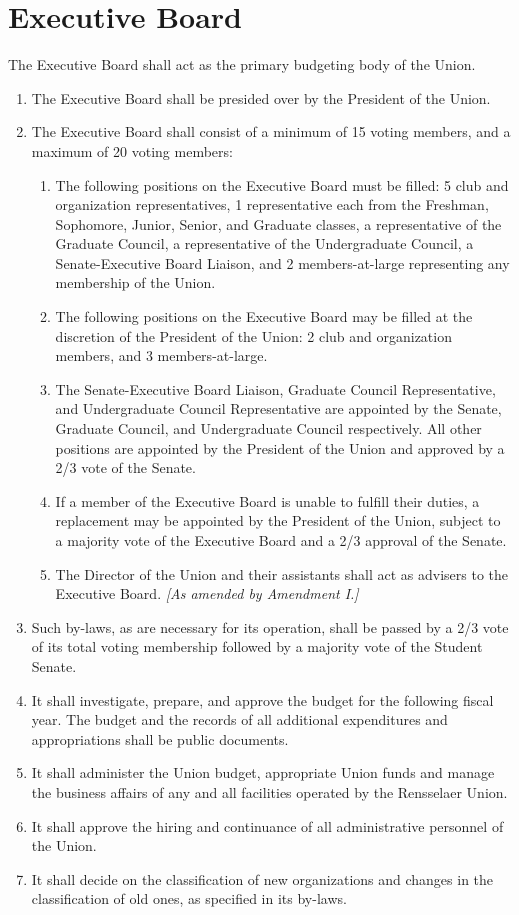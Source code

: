 \documentclass{uniondoc}
\begin{document}
\section{Executive Board}

The Executive Board shall act as the primary budgeting body of the Union.

\begin{enumerate}
\item The Executive Board shall be presided over by the President of the Union.
\item The Executive Board shall consist of a minimum of 15 voting members, and a maximum of 20 voting members:
  \begin{enumerate}
  \item The following positions on the Executive Board must be filled: 5 club and organization representatives, 1 representative each from the Freshman, Sophomore, Junior, Senior, and Graduate classes, a representative of the Graduate Council, a representative of the Undergraduate Council, a Senate-Executive Board Liaison, and 2 members-at-large representing any membership of the Union.
  \item The following positions on the Executive Board may be filled at the discretion of the President of the Union: 2 club and organization members, and 3 members-at-large.
  \item The Senate-Executive Board Liaison, Graduate Council Representative, and Undergraduate Council Representative are appointed by the Senate, Graduate Council, and Undergraduate Council respectively. All other positions are appointed by the President of the Union and approved by a 2/3 vote of the Senate.
  \item If a member of the Executive Board is unable to fulfill their duties, a replacement may be appointed by the President of the Union, subject to a majority vote of the Executive Board and a 2/3 approval of the Senate.
  \item The Director of the Union and their assistants shall act as advisers to the Executive Board. \textit{[As amended by Amendment I.]}
  \end{enumerate}
\item Such by-laws, as are necessary for its operation, shall be passed by a 2/3 vote of its total voting membership followed by a majority vote of the Student Senate.
\item It shall investigate, prepare, and approve the budget for the following fiscal year. The budget and the records of all additional expenditures and appropriations shall be public documents.
\item It shall administer the Union budget, appropriate Union funds and manage the business affairs of any and all facilities operated by the Rensselaer Union.
\item It shall approve the hiring and continuance of all administrative personnel of the Union.
\item It shall decide on the classification of new organizations and changes in the classification of old ones, as specified in its by-laws.
\end{enumerate}
\end{document}
